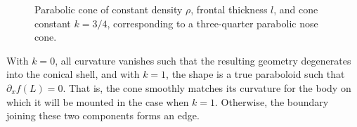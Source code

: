 \documentclass[11pt,dvipsnames]{thesis}
\begin{document}
\begin{figure}[H]
\begin{subfigure}[t]{0.5\textwidth}
\begin{tikzpicture}[scale=2]

\end{tikzpicture}
\end{subfigure}

\caption{Parabolic cone of constant density $\rho$, frontal thickness $l$, and cone constant $k = 3/4$, corresponding to a three-quarter parabolic nose cone.}
\end{figure}
\noindent
With $k = 0$, all curvature vanishes such that the resulting geometry degenerates into the conical shell, and with $k = 1$, the shape is a true paraboloid such that $\partial_x f(L) = 0$. That is, the cone smoothly matches its curvature for the body on which it will be mounted in the case when $k = 1$. Otherwise, the boundary joining these two components forms an edge.
\end{document}
